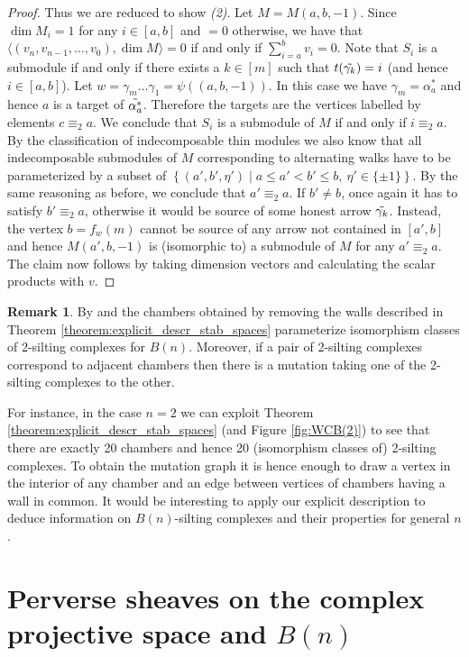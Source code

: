 \documentclass[11pt]{amsart}
\theoremstyle{definition}
\newtheorem{remark}[theorem]{Remark}
\begin{document}
\begin{proof}
    Thus we are reduced to show \emph{(2)}. Let   $M=M(a,b,-1)$. Since $\dim M_i=1$ for any $i\in[a,b]$ and $=0$ otherwise, we have that $\langle (v_n, v_{n-1}, \ldots, v_0),\dim M\rangle=0$ if and only if $\sum_{i=a}^b v_i=0$. Note that $S_i$ is a submodule if and only if there exists a $k\in[m]$ such that $t(\Tilde{\gamma_k})=i$ (and hence $i\in[a,b]$). Let $w=\gamma_m\ldots \gamma_1=\psi((a,b,-1))$. In this case we have $\gamma_m=\alpha_a^*$ and hence $a$ is a target of $\Tilde{\alpha_a^*}$. Therefore the targets are the vertices labelled by elements $c\equiv_2 a$. We conclude that $S_i$ is a submodule of $M$ if and only if $i\equiv_2 a$. By the classification of indecomposable thin modules we also know that all indecomposable submodules of $M$ corresponding to alternating walks have to be parameterized by a subset of
    $\left\{(a', b', \eta')\mid a\leq a'<b'\leq b, \ \eta'\in\{\pm 1\}\right\}$. By the same reasoning as  before, we conclude that $a'\equiv_2 a$. If $b'\neq b$, once again it has to satisfy $b'\equiv_2 a$, otherwise it would be source of some honest arrow $\Tilde{\gamma_k}$. Instead, the vertex $b=f_w(m)$ cannot be source of any arrow not contained in $[a',b]$ and hence $M(a',b,-1)$ is (isomorphic to) a submodule of $M$ for any $a'\equiv_2 a$. The claim now follows by taking dimension vectors and calculating the scalar products with $v$.
\end{proof}

\begin{remark}
    By \cite{asai} and \cite{BST19} the chambers obtained by removing the walls described in Theorem \ref{theorem:explicit_descr_stab_spaces} parameterize isomorphism classes of 2-silting complexes for $B(n)$. Moreover, if a pair of 2-silting complexes correspond to adjacent chambers then there is a mutation taking one of the 2-silting complexes to the other. 
    
    For instance, in the case $n=2$ we can exploit Theorem \ref{theorem:explicit_descr_stab_spaces} (and Figure \ref{fig:WCB(2)}) to see that there are exactly 20 chambers and hence 20 (isomorphism classes of) 2-silting complexes. To obtain the mutation graph it is hence enough to draw a vertex in the interior of any chamber and an edge between vertices of chambers having a wall in common. It would be interesting to apply our explicit description to deduce information on $B(n)$-silting complexes and their properties for general $n$.
\end{remark}

\section{Perverse sheaves on the complex projective space and $B(n)$}\label{sec:perverse}
\end{document}
